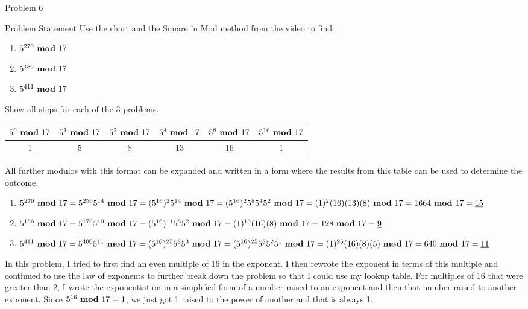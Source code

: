 \begin{problem}{Problem 6}
    \begin{statement}{Problem Statement}
        Use the chart and the Square 'n Mod method from the video to find:

        \begin{enumerate}[label = (\alph*)]
            \item $5^{270} \text{ \textbf{mod} } 17$
            \item $5^{186} \text{ \textbf{mod} } 17$
            \item $5^{411} \text{ \textbf{mod} } 17$
        \end{enumerate}
        Show all steps for each of the 3 problems.
    \end{statement}

    \begin{Highlight}
        \begin{center}
            \begin{tabular}[ht]{|c|c|c|c|c|c|}
                \hline $5^{0} \text{ \textbf{mod} } 17$ & $5^{1} \text{ \textbf{mod} } 17$ & $5^{2} \text{ \textbf{mod} } 17$ & $5^{4} \text{ \textbf{mod} } 17$ & $5^{8} \text{ \textbf{mod} } 17$ & $5^{16} \text{ \textbf{mod} } 17$ \\ \hline
                1 & 5 & 8 & 13 & 16 & 1 \\ \hline
            \end{tabular}
        \end{center}
        All further modulos with this format can be expanded and written in a form where the results from this table can be used to determine the outcome.
    \end{Highlight}

    \begin{Highlight}[Solution]
        \begin{enumerate}[label = (\alph*)]
            \item $5^{270} \text{ \textbf{mod} } 17 = 5^{256}5^{14} \text{ \textbf{mod} } 17 = (5^{16})^{2}5^{14} \text{ \textbf{mod} } 17 = (5^{16})^{2}5^{8}5^{4}5^{2} \text{ \textbf{mod} } 17 = (1)^{2}(16)(13)(8) \text{ \textbf{mod} } 17 = 1664 \text{ \textbf{mod} } 17 = \underbar{15}$
            \item $5^{186} \text{ \textbf{mod} } 17 = 5^{176}5^{10} \text{ \textbf{mod} } 17 = (5^{16})^{11}5^{8}5^{2} \text{ \textbf{mod} } 17 = (1)^{16}(16)(8) \text{ \textbf{mod} } 17 = 128 \text{ \textbf{mod} } 17 = \underbar{9}$
            \item $5^{411} \text{ \textbf{mod} } 17 = 5^{400}5^{11} \text{ \textbf{mod} } 17 = (5^{16})^{25}5^{8}5^{3} \text{ \textbf{mod} } 17 = (5^{16})^{25}5^{8}5^{2}5^{1} \text{ \textbf{mod} } 17 = (1)^{25}(16)(8)(5) \text{ \textbf{mod} } 17 = 640 \text{ \textbf{mod} } 17 = \underbar{11}$
        \end{enumerate}
        In this problem, I tried to first find an even multiple of 16 in the exponent. I then rewrote the exponent in terms of this multiple and continued to use the law of exponents to further break
        down the problem so that I could use my lookup table. For multiples of 16 that were greater than 2, I wrote the exponentiation in a simplified form of a number raised to an exponent and then
        that number raised to another exponent. Since $5^{16} \text{ \textbf{mod} } 17 = 1$, we just got 1 raised to the power of another and that is always 1.
    \end{Highlight}
\end{problem}

